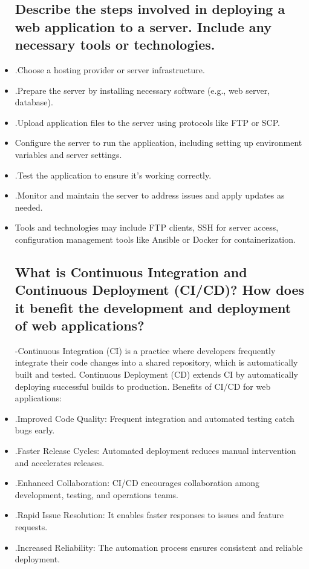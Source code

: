 \documentclass{article}
\begin{document}
\begin{itemize}
\subsection{Describe the steps involved in deploying a web application to a server. Include any necessary tools or technologies.}
\item{.Choose a hosting provider or server infrastructure.}
\item{.Prepare the server by installing necessary software (e.g., web server, database).}
\item{.Upload application files to the server using protocols like FTP or SCP.}
\item{Configure the server to run the application, including setting up environment variables and server settings.}
\item{.Test the application to ensure it's working correctly.}
\item{.Monitor and maintain the server to address issues and apply updates as needed.}
\item {Tools and technologies may include FTP clients, SSH for server access, configuration management tools like Ansible or Docker for containerization.}
\subsection{What is Continuous Integration and Continuous Deployment (CI/CD)? How does it benefit the development and deployment of web applications?}
-Continuous Integration (CI) is a practice where developers frequently integrate their code changes into a shared repository, which is automatically built and tested. Continuous Deployment (CD) extends CI by automatically deploying successful builds to production. Benefits of CI/CD for web applications:
\item {.Improved Code Quality: Frequent integration and automated testing catch bugs early.}
\item {.Faster Release Cycles: Automated deployment reduces manual intervention and accelerates releases.}
\item {.Enhanced Collaboration: CI/CD encourages collaboration among development, testing, and operations teams.}     
\item {.Rapid Issue Resolution: It enables faster responses to issues and feature requests.}
\item {.Increased Reliability: The automation process ensures consistent and reliable deployment.}                                        
\end{itemize}
\end{document}

